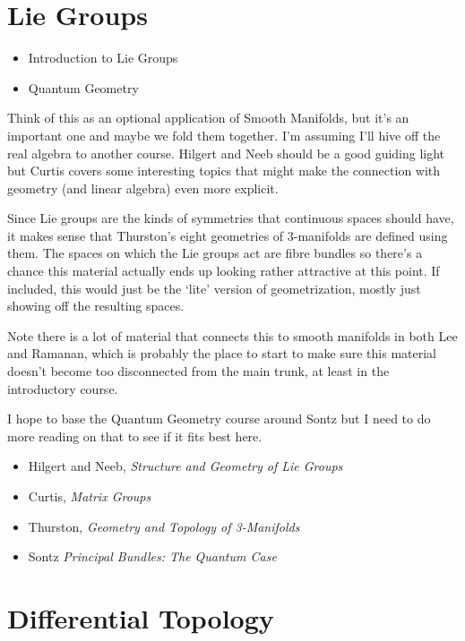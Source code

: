 \documentclass[article]{article}
\begin{document}
\section{Lie Groups}

\begin{itemize}
	\item{Introduction to Lie Groups}
	\item{Quantum Geometry}
\end{itemize}

Think of this as an optional application of Smooth Manifolds, but it's an important one and maybe we fold them together. I'm assuming I'll hive off the real algebra to another course. Hilgert and Neeb should be a good guiding light but Curtis covers some interesting topics that might make the connection with geometry (and linear algebra) even more explicit. 

Since Lie groups are the kinds of symmetries that continuous spaces should have, it makes sense that Thurston's eight geometries of 3-manifolds are defined using them. The spaces on which the Lie groups act are fibre bundles so there's a chance this material actually ends up looking rather attractive at this point. If included, this would just be the `lite' version of geometrization, mostly just showing off the resulting spaces.

Note there is a lot of material that connects this to smooth manifolds in both Lee and Ramanan, which is probably the place to start to make sure this material doesn't become too disconnected from the main trunk, at least in the introductory course. 

I hope to base the Quantum Geometry course around Sontz but I need to do more reading on that to see if it fits best here.

\begin{itemize}
	\item[]{Hilgert and Neeb, \textit{Structure and Geometry of Lie Groups}}
	\item[]{Curtis, \textit{Matrix Groups}}
	\item[]{Thurston, \textit{Geometry and Topology of 3-Manifolds}}
	\item Sontz \textit{Principal Bundles: The Quantum Case}
\end{itemize}

\section{Differential Topology}
\end{document}
